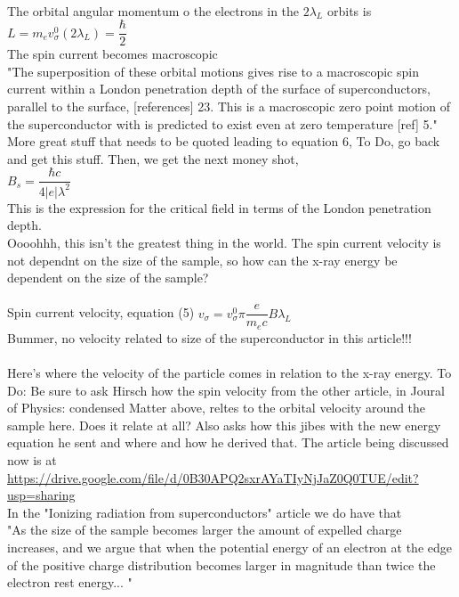 \documentclass[prb,preprint]
{revtex4-1}
\begin{document}
\\
The orbital angular momentum o the electrons in the $2 \lambda_L$ orbits is 
\\
$L = m_e v_\sigma^0 \left(2 \lambda_L\right) = \dfrac{\hbar}{2}$
\\
The spin current becomes macroscopic
\\
"The superposition of these orbital motions gives rise to a macroscopic spin current within a London penetration depth of the surface of superconductors, parallel to the surface, [references] 23.  This is a macroscopic zero point motion of the superconductor with is predicted to exist even at zero temperature [ref] 5."
\\
More great stuff that needs to be quoted leading to equation 6, To Do, go back and get this stuff.  Then, we get the next money shot,
\\
$B_s = \dfrac{\hbar c}{4 |e| \lambda^2}$
\\
This is the expression for the critical field in terms of the London penetration depth.  
\\
Oooohhh, this isn't the greatest thing in the world.  The spin current velocity is not dependnt on the size of the sample, so how can the x-ray energy be dependent on the size of the sample?
\\
\\
Spin current velocity, equation (5)
$v_\sigma = v_\sigma^0 \pi \dfrac{e}{m_e c}B \lambda_L$
\\Bummer, no velocity related to size of the superconductor in this article!!!
\\
\\
Here's where the velocity of the particle comes in relation to the x-ray energy.  To Do:  Be sure to ask Hirsch how the spin velocity from the other article, in Joural of Physics: condensed Matter above, reltes to the orbital velocity around the sample here.  Does it relate at all?  Also asks how this jibes with the new energy equation he sent and where and how he derived that.  The article being discussed now is at 
\\
\url{https://drive.google.com/file/d/0B30APQ2sxrAYaTIyNjJaZ0Q0TUE/edit?usp=sharing}
\\
In the "Ionizing radiation from superconductors" article we do have that 
\\
"As the size of the sample becomes larger the amount of expelled charge increases, and we argue that when the potential energy of an electron at the edge of the positive charge distribution becomes larger in magnitude than twice the electron rest energy... "
\end{document}
